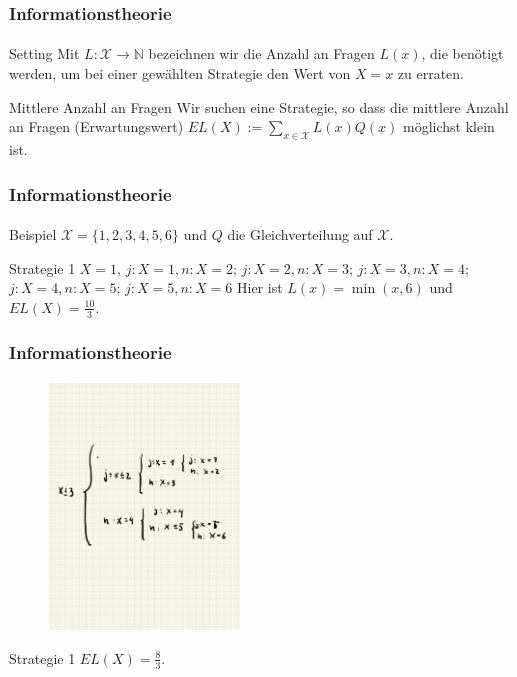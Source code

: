 \documentclass{beamer}
\begin{document}
\begin{frame}
    \frametitle{Informationstheorie}
\framesubtitle{}
\begin{block}{Setting}
Mit $L : \mathcal{X} \to \mathbb{N}$ bezeichnen wir die Anzahl an Fragen $L(x)$, die benötigt werden, um bei einer gewählten Strategie den Wert von $X = x$ zu erraten.
\end{block}

\begin{block}{Mittlere Anzahl an Fragen}
Wir suchen eine Strategie, so dass die mittlere Anzahl an Fragen  (Erwartungswert) $EL(X) := \sum_{x \in \mathcal{X}} L(x) Q(x)$  möglichst klein ist.
\end{block}

 \end{frame}


\begin{frame}
    \frametitle{Informationstheorie}
\framesubtitle{}

\begin{block}{Beispiel}
 $\mathcal{X} = \{ 1,2,3,4,5,6 \}$ und $Q$ die Gleichverteilung auf $\mathcal{X}$.
\end{block}

\begin{block}{Strategie 1}
$X = 1$, $j: X = 1, n: X = 2$; $j: X = 2, n:X= 3$; $j:X = 3, n:X= 4$; $j:X = 4, n:X= 5$; $j:X = 5, n:X= 6$ 
Hier ist $L(x) = \min(x,6)$ und $EL(X) = \frac{10}{3}$.
\end{block}

 \end{frame}

\begin{frame}
    \frametitle{Informationstheorie}
\framesubtitle{}
\begin{figure}[htp]
      \centering
    \includegraphics[width=0.45\textwidth]{img/strategie2}
\end{figure}

\begin{block}{Strategie 1}
 $EL(X) = \frac{8}{3}$.
\end{block}

 \end{frame}
\end{document}
